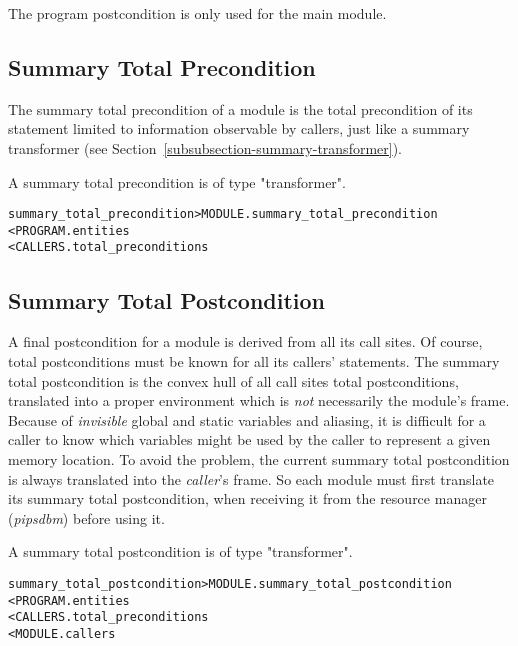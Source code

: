 \documentclass[a4paper]{report}
\newenvironment{PipsMake}{\begin{alltt}}{\end{alltt}}
\begin{document}
The program postcondition is only used for the main module.

\subsection{Summary Total Precondition}

The summary total precondition of a module is the total precondition of
its statement limited to information observable by callers, just like a
summary transformer (see Section~\ref{subsubsection-summary-transformer}).

A summary total precondition is of type "transformer".

\begin{PipsMake}
summary_total_precondition            > MODULE.summary_total_precondition
        < PROGRAM.entities
        < CALLERS.total_preconditions
\end{PipsMake}

\subsection{Summary Total Postcondition}

A final postcondition for a module is derived from all its call
sites. Of course, total postconditions must be known for all its callers'
statements.  The summary total postcondition is the convex hull of all call
sites total postconditions, translated into a proper environment which is {\em
not} necessarily the module's frame. Because of {\em invisible} global
and static variables and aliasing, it is difficult for a caller to know which
variables might be used by the caller to represent a given memory
location. To avoid the problem, the current summary total postcondition is
always translated into the {\em caller}'s frame. So each module must
first translate its summary total postcondition, when receiving it from the
resource manager ({\em pipsdbm}) before using it.

A summary total postcondition is of type "transformer".

\begin{PipsMake}
summary_total_postcondition            > MODULE.summary_total_postcondition
        < PROGRAM.entities
        < CALLERS.total_preconditions
        < MODULE.callers
\end{PipsMake}
\end{document}
